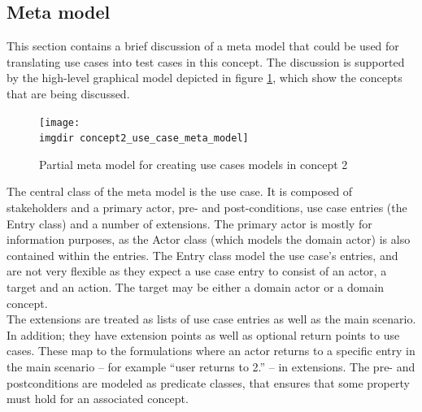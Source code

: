 \subsection{Meta model}
This section contains a brief discussion of a meta model that could be used for translating use cases into test cases in this concept. The discussion is supported by the high-level graphical model depicted in figure \ref{fig:concept2_use_case_meta_model}, which show the concepts that are being discussed.\medskip

\begin{figure}[h]
  \centering
  \texttt{[image: \\imgdir concept2\_use\_case\_meta\_model]}
  \caption{Partial meta model for creating use cases models in concept 2}
  \label{fig:concept2_use_case_meta_model}
\end{figure}

\noindent The central class of the meta model is the use case. It is composed of stakeholders and a primary actor, pre- and post-conditions, use case entries (the Entry class) and a number of extensions. The primary actor is mostly for information purposes, as the Actor class (which models the domain actor) is also contained within the entries. The Entry class model the use case's entries, and are not very flexible as they expect a use case entry to consist of an actor, a target and an action. The target may be either a domain actor or a domain concept.\\
The extensions are treated as lists of use case entries as well as the main scenario. In addition; they have extension points as well as optional return points to use cases. These map to the formulations where an actor returns to a specific entry in the main scenario -- for example ``user returns to 2.'' -- in extensions. The pre- and postconditions are modeled as predicate classes, that ensures that some property must hold for an associated concept.

